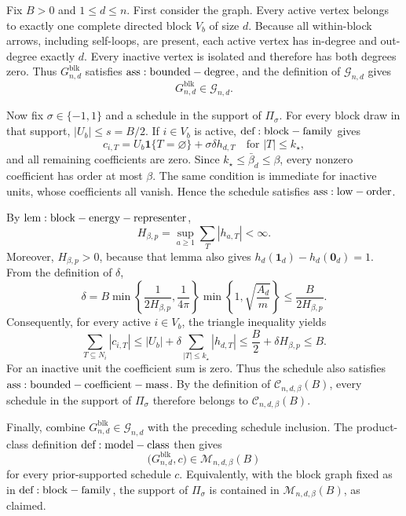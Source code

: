 Fix \(B>0\) and \(1\le d\le n\). First consider the graph. Every active vertex belongs to exactly one complete directed block \(V_b\) of size \(d\). Because all within-block arrows, including self-loops, are present, each active vertex has in-degree and out-degree exactly \(d\). Every inactive vertex is isolated and therefore has both degrees zero. Thus \(G_{n,d}^{\mathrm{blk}}\) satisfies \({\rm ass:bounded-degree}\), and the definition of \(\mathcal G_{n,d}\) gives
\[
G_{n,d}^{\mathrm{blk}}\in\mathcal G_{n,d}.
\]

Now fix \(\sigma\in\{-1,1\}\) and a schedule in the support of \(\Pi_\sigma\). For every block draw in that support, \(|U_b|\le s=B/2\). If \(i\in V_b\) is active, \({\rm def:block-family}\) gives
\[
c_{i,T}=U_b\mathbf 1\{T=\varnothing\}+\sigma\delta h_{d,T}
\quad\text{for }|T|\le k_\star,
\]
and all remaining coefficients are zero. Since \(k_\star\le\bar\beta_d\le\beta\), every nonzero coefficient has order at most \(\beta\). The same condition is immediate for inactive units, whose coefficients all vanish. Hence the schedule satisfies \({\rm ass:low-order}\).

By \({\rm lem:block-energy-representer}\),
\[
H_{\beta,p}=\sup_{a\ge1}\sum_T|h_{a,T}|<\infty.
\]
Moreover, \(H_{\beta,p}>0\), because that lemma also gives \(h_d(\mathbf 1_d)-h_d(\mathbf 0_d)=1\). From the definition of \(\delta\),
\[
\delta
=B\min\!\left\{\frac{1}{2H_{\beta,p}},\frac{1}{4\pi}\right\}
       \min\!\left\{1,\sqrt{\frac{A_d}{m}}\right\}
\le \frac{B}{2H_{\beta,p}}.
\]
Consequently, for every active \(i\in V_b\), the triangle inequality yields
\[
\sum_{T\subseteq N_i}|c_{i,T}|
\le |U_b|+\delta\sum_{|T|\le k_\star}|h_{d,T}|
\le \frac B2+\delta H_{\beta,p}
\le B.
\]
For an inactive unit the coefficient sum is zero. Thus the schedule also satisfies \({\rm ass:bounded-coefficient-mass}\). By the definition of \(\mathcal C_{n,d,\beta}(B)\), every schedule in the support of \(\Pi_\sigma\) therefore belongs to \(\mathcal C_{n,d,\beta}(B)\).

Finally, combine \(G_{n,d}^{\mathrm{blk}}\in\mathcal G_{n,d}\) with the preceding schedule inclusion. The product-class definition \({\rm def:model-class}\) then gives
\[
\bigl(G_{n,d}^{\mathrm{blk}},c\bigr)\in\mathcal M_{n,d,\beta}(B)
\]
for every prior-supported schedule \(c\). Equivalently, with the block graph fixed as in \({\rm def:block-family}\), the support of \(\Pi_\sigma\) is contained in \(\mathcal M_{n,d,\beta}(B)\), as claimed.